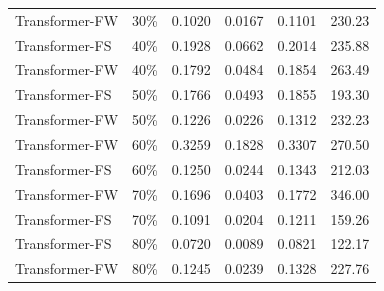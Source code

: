 \begin{longtable}{l c c c c c}
        Transformer-FW & 30\% & 0.1020 & 0.0167 & 0.1101 & 230.23 \\
        Transformer-FS & 40\% & 0.1928 & 0.0662 & 0.2014 & 235.88 \\
        Transformer-FW & 40\% & 0.1792 & 0.0484 & 0.1854 & 263.49 \\
        Transformer-FS & 50\% & 0.1766 & 0.0493 & 0.1855 & 193.30 \\
        Transformer-FW & 50\% & 0.1226 & 0.0226 & 0.1312 & 232.23 \\
        Transformer-FW & 60\% & 0.3259 & 0.1828 & 0.3307 & 270.50 \\
        Transformer-FS & 60\% & 0.1250 & 0.0244 & 0.1343 & 212.03 \\
        Transformer-FW & 70\% & 0.1696 & 0.0403 & 0.1772 & 346.00 \\
        Transformer-FS & 70\% & 0.1091 & 0.0204 & 0.1211 & 159.26 \\
        Transformer-FS & 80\% & 0.0720 & 0.0089 & 0.0821 & 122.17 \\
        Transformer-FW & 80\% & 0.1245 & 0.0239 & 0.1328 & 227.76 \\

\end{longtable}
